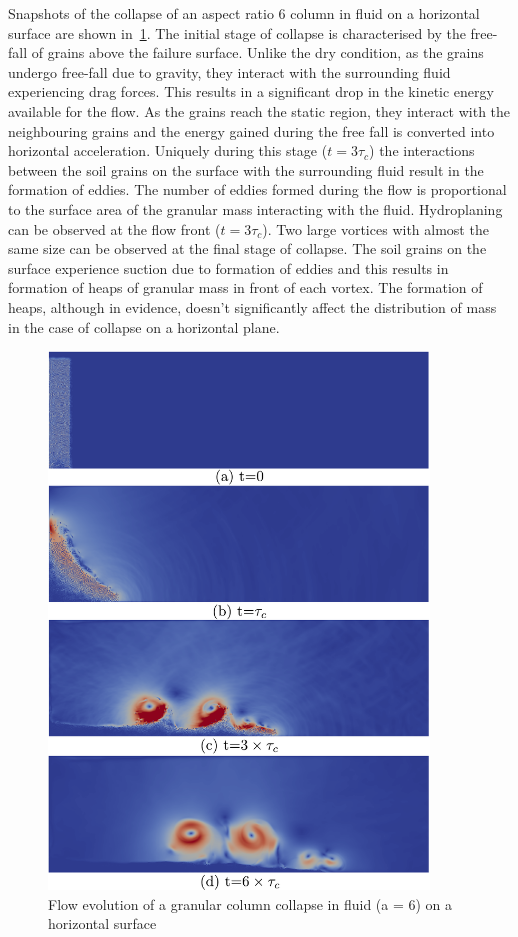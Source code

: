 Snapshots of the collapse of an aspect ratio 6 column in fluid on a horizontal 
surface are shown in~\cref{fig:LBM_DEM_a6}. The initial stage of collapse is 
characterised by the free-fall of grains above the failure surface. Unlike the 
dry condition, as the 
grains undergo free-fall due to gravity, they interact with the surrounding 
fluid experiencing drag forces. This results in a significant drop in the 
kinetic energy available for the flow. As the grains reach 
the static region, they interact with the neighbouring grains and the energy 
gained during the free fall is converted into horizontal acceleration. Uniquely 
during this stage ($t = 3\tau_c$) the interactions between the soil grains on 
the surface with the surrounding fluid result in the formation of eddies. The 
number of eddies formed during the flow is proportional to the surface area of 
the granular mass interacting with the fluid. Hydroplaning can be observed at 
the flow front ($t = 3\tau_c$). Two large vortices with almost the same size 
can be observed at the final stage of collapse. The soil grains on the surface 
experience suction due to formation of eddies and this results in formation of 
heaps of granular mass in front of each vortex. The formation of heaps, 
although in evidence, doesn't significantly affect the distribution of mass in 
the case of collapse on a horizontal plane. 

\begin{figure}[htpb]
\centering
\includegraphics[width=0.9\textwidth]{LBM_DEM_a6}
\caption{Flow evolution of a granular column collapse in fluid (a = 6) on a 
horizontal surface}
\label{fig:LBM_DEM_a6}
\end{figure}


